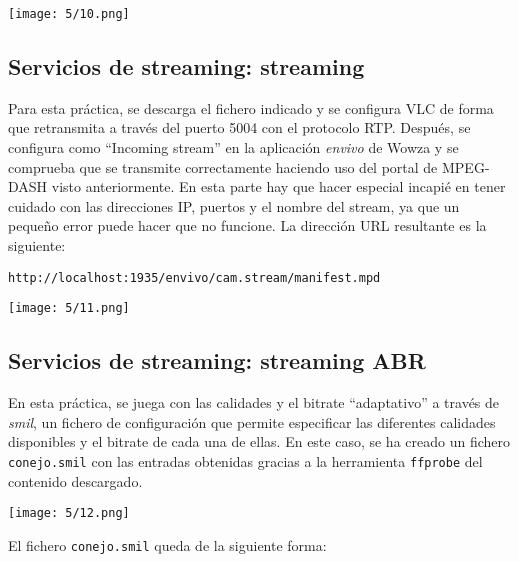 \begin{minipage}{\linewidth}
	\centering
	\texttt{[image: 5/10.png]}
	\label{fig:5/10}
\end{minipage}

\subsection{Servicios de streaming: streaming}
Para esta práctica, se descarga el fichero indicado y se configura VLC de forma que retransmita
a través del puerto 5004 con el protocolo RTP{.} Después, se configura como ``Incoming stream''
en la aplicación \textit{envivo} de Wowza y se comprueba que se transmite correctamente haciendo
uso del portal de MPEG-DASH visto anteriormente. En esta parte hay que hacer especial incapié en
tener cuidado con las direcciones IP, puertos y el nombre del stream, ya que un pequeño error
puede hacer que no funcione. La dirección URL resultante es la siguiente:

\begin{verbatim}
http://localhost:1935/envivo/cam.stream/manifest.mpd
\end{verbatim}

\begin{minipage}{\linewidth}
	\centering
	\texttt{[image: 5/11.png]}
	\label{fig:5/11}
\end{minipage}

\subsection{Servicios de streaming: streaming ABR}
En esta práctica, se juega con las calidades y el bitrate ``adaptativo'' a través de
\textit{smil}, un fichero de configuración que permite especificar las diferentes
calidades disponibles y el bitrate de cada una de ellas. En este caso, se ha creado
un fichero \Verb#conejo.smil# con las entradas obtenidas gracias a la herramienta
\Verb#ffprobe# del contenido descargado.

\begin{minipage}{\linewidth}
	\centering
	\texttt{[image: 5/12.png]}
	\label{fig:5/12}
\end{minipage}

El fichero \Verb#conejo.smil# queda de la siguiente forma:

